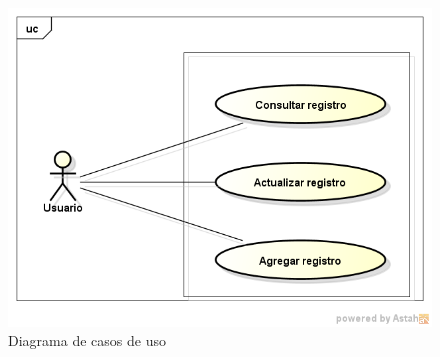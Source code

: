 \documentclass[11pt,spanish,a4paper,openany,notitlepage]{article}
\begin{document}
\begin{figure}[H]
\begin{center}
\includegraphics[width=350pt]{casos_uso.png}
\caption{Diagrama de casos de uso}
\end{center}
\end{figure}
\end{document}
